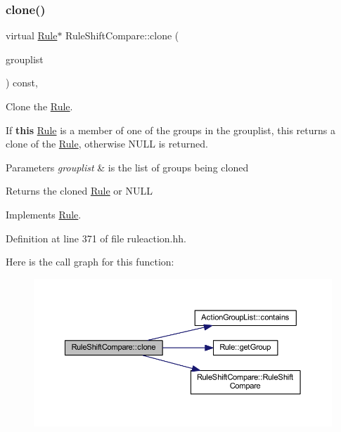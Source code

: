 \subsubsection{\texorpdfstring{clone()}{clone()}}
{\footnotesize\ttfamily virtual \mbox{\hyperlink{class_rule}{Rule}}$\ast$ Rule\+Shift\+Compare\+::clone (\begin{DoxyParamCaption}\item[{const \mbox{\hyperlink{class_action_group_list}{Action\+Group\+List}} \&}]{grouplist }\end{DoxyParamCaption}) const\hspace{0.3cm}{\ttfamily [inline]}, {\ttfamily [virtual]}}



Clone the \mbox{\hyperlink{class_rule}{Rule}}. 

If {\bfseries{this}} \mbox{\hyperlink{class_rule}{Rule}} is a member of one of the groups in the grouplist, this returns a clone of the \mbox{\hyperlink{class_rule}{Rule}}, otherwise N\+U\+LL is returned. 
\begin{DoxyParams}{Parameters}
{\em grouplist} & is the list of groups being cloned \\
\hline
\end{DoxyParams}
\begin{DoxyReturn}{Returns}
the cloned \mbox{\hyperlink{class_rule}{Rule}} or N\+U\+LL 
\end{DoxyReturn}


Implements \mbox{\hyperlink{class_rule_a70de90a76461bfa7ea0b575ce3c11e4d}{Rule}}.



Definition at line 371 of file ruleaction.\+hh.

Here is the call graph for this function\+:
\nopagebreak
\begin{figure}[H]
\begin{center}
\leavevmode
\includegraphics[width=350pt]{class_rule_shift_compare_aea9f8ff6217f01e880ae5c3fd4370837_cgraph}
\end{center}
\end{figure}
\mbox{\label{class_rule_shift_compare_af7f79c1e9cc85d39b7dd16a29b3e8a95}} 
